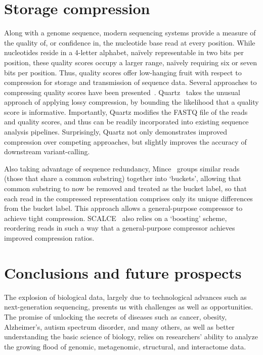 \documentclass{acm_proc_article-sp}
\begin{document}
\section{Storage compression}

Along with a genome sequence, modern sequencing systems provide a measure of
the quality of, or confidence in, the nucleotide base read at every position.
While nucleotides reside in a 4-letter alphabet, na\"ively representable in two 
bits per position, these quality scores occupy a larger range, na\"ively
requiring six or seven bits per position.
Thus, quality scores offer low-hanging fruit with respect to compression for 
storage and transmission of sequence data.
Several approaches to compressing quality scores have been 
presented~\cite{janin2013adaptive,bonfield2013compression,ochoa2013qualcomp,yu2015quality}.
Quartz~\cite{yu2015quality} takes the unusual approach of applying lossy 
compression, by bounding the likelihood that a quality score is informative.
Importantly, Quartz modifies the FASTQ file of the reads and quality scores, and thus can be
readily incorporated into existing sequence analysis pipelines.
Surprisingly, Quartz not only demonstrates improved compression over competing
approaches, but slightly improves the accuracy of downstream variant-calling.

Also taking advantage of sequence redundancy, Mince~\cite{patro2015data} groups 
similar reads (those that share a common 
substring) together into `buckets', allowing that common substring to now be 
removed and treated as the bucket label, so that each read in the compressed 
representation comprises only its unique differences from the bucket label.
This approach allows a general-purpose compressor to achieve tight compression.
SCALCE~\cite{berger2013computational} also relies on a `boosting' scheme, 
reordering
reads in such a way that a general-purpose compressor achieves improved
compression ratios.

\section{Conclusions and future prospects}

The explosion of biological data, largely due to technological advances such as
next-generation sequencing, presents us with challenges as well as 
opportunities.
The promise of unlocking the secrets of diseases such as cancer, obesity,
Alzheimer's, autism spectrum disorder, and many others, as well as better 
understanding the basic science of biology, relies on researchers' ability to 
analyze the growing flood of genomic, metagenomic, structural, and interactome 
data.
\end{document}
